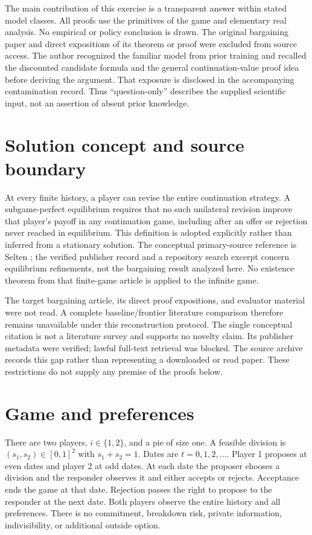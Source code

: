 \documentclass[11pt]{article}
\begin{document}
The main contribution of this exercise is a transparent answer within stated model classes. All proofs use the primitives of the game and elementary real analysis. No empirical or policy conclusion is drawn. The original bargaining paper and direct expositions of its theorem or proof were excluded from source access. The author recognized the familiar model from prior training and recalled the discounted candidate formula and the general continuation-value proof idea before deriving the argument. That exposure is disclosed in the accompanying contamination record. Thus ``question-only'' describes the supplied scientific input, not an assertion of absent prior knowledge.

\section{Solution concept and source boundary}
At every finite history, a player can revise the entire continuation strategy. A subgame-perfect equilibrium requires that no such unilateral revision improve that player's payoff in any continuation game, including after an offer or rejection never reached in equilibrium. This definition is adopted explicitly rather than inferred from a stationary solution. The conceptual primary-source reference is Selten \cite{selten1975}; the verified publisher record and a repository search excerpt concern equilibrium refinements, not the bargaining result analyzed here. No existence theorem from that finite-game article is applied to the infinite game.

The target bargaining article, its direct proof expositions, and evaluator material were not read. A complete baseline/frontier literature comparison therefore remains unavailable under this reconstruction protocol. The single conceptual citation is not a literature survey and supports no novelty claim. Its publisher metadata were verified; lawful full-text retrieval was blocked. The source archive records this gap rather than representing a downloaded or read paper. These restrictions do not supply any premise of the proofs below.

\section{Game and preferences}\label{sec:model}
There are two players, $i\in\{1,2\}$, and a pie of size one. A feasible division is $(s_1,s_2)\in[0,1]^2$ with $s_1+s_2=1$. Dates are $t=0,1,2,\ldots$. Player 1 proposes at even dates and player 2 at odd dates. At each date the proposer chooses a division and the responder observes it and either accepts or rejects. Acceptance ends the game at that date. Rejection passes the right to propose to the responder at the next date. Both players observe the entire history and all preferences. There is no commitment, breakdown risk, private information, indivisibility, or additional outside option.
\end{document}
